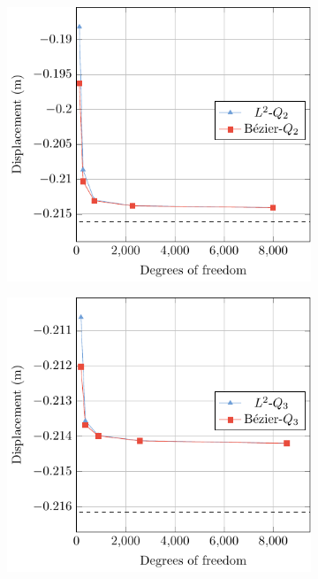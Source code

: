 \documentclass[preprint,12pt]{elsarticle}
\theoremstyle{remark}
\begin{document}
\begin{figure}[!hbt]
    \centering
    \captionsetup[subfigure]{font = footnotesize}
    \begin{subfigure}[b]{.32\textwidth}
        \centering
        \includegraphics[width = \textwidth]{L-beam-p=2}
        \caption{}
    \end{subfigure}
    \begin{subfigure}[b]{.32\textwidth}
        \centering
        \includegraphics[width = \textwidth]{L-beam-p=3}

\end{subfigure}
\end{figure}
\end{document}
